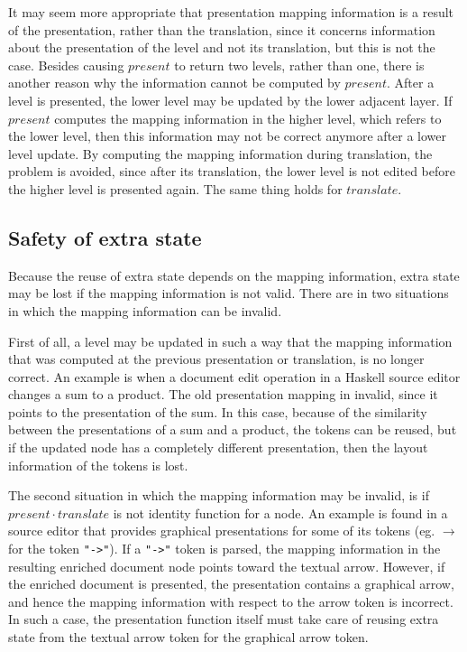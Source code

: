 It may seem more appropriate that presentation mapping information is a result of the presentation, rather than the translation, since it concerns information about the presentation of the level and not its translation, but this is not the case. Besides causing $present$ to return two levels, rather than one, there is another reason why the information cannot be computed by $present$. After a level is presented, the lower level may be updated by the lower adjacent layer. If $present$ computes the mapping information in the higher level, which refers to the lower level, then this information may not be correct anymore after a lower level update. By computing the mapping information during translation, the problem is avoided, since after its translation, the lower level is not edited before the higher level is presented again. The same thing holds for $translate$.



%										
%										
\subsection{Safety of extra state}

Because the reuse of extra state depends on the mapping information, extra state may be lost if the mapping information is not valid. There are in two situations in which the mapping information can be invalid.  

First of all, a level may be updated in such a way that the mapping information that was computed at the previous presentation or translation, is no longer correct. An example is when a document edit operation in a Haskell source editor changes a sum to a product. The old presentation mapping in invalid, since it points to the presentation of the sum. In this case, because of the similarity between the presentations of a sum and a product, the tokens can be reused, but if the updated node has a completely different presentation, then the layout information of the tokens is lost.

The second situation in which the mapping information may be invalid, is if $present \cdot translate$ is not identity function for a node.  An example is found in a source editor that provides graphical presentations for some of its tokens (eg. $\rightarrow$ for the token \verb|"->"|). If a \verb|"->"| token is parsed, the mapping information in the resulting enriched document node points toward the textual arrow. However, if the enriched document is presented, the presentation contains a graphical arrow, and hence the mapping information with respect to the arrow token is incorrect. In such a case, the presentation function itself must take care of reusing extra state from the textual arrow token for the graphical arrow token.

